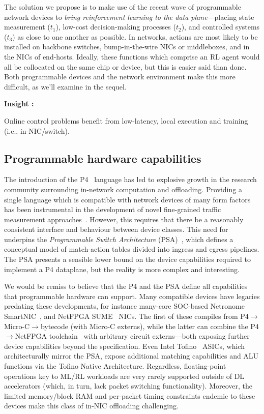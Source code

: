 \documentclass[sigconf,natbib=false]{acmart}
\newcounter{insightc}
\newenvironment{insight}
	{
		\begin{tipblock}\refstepcounter{insightc}\textbf{Insight \theinsightc:}\em
	}
	{
		\end{tipblock}
	}
\begin{document}
The solution we propose is to make use of the recent wave of programmable network devices to \emph{bring reinforcement learning to the data plane}---placing state measurement ($t_1$), low-cost decision-making processes ($t_2$), and controlled systems ($t_3$) as close to one another as possible.
In networks, actions are most likely to be installed on backbone switches, bump-in-the-wire NICs or middleboxes, and in the NICs of end-hosts.
Ideally, these functions which comprise an RL agent would all be collocated on the same chip or device, but this is easier said than done. 
Both programmable devices and the network environment make this more difficult, as we'll examine in the sequel.

\begin{insight}
	Online control problems benefit from low-latency, local execution and training (i.e., in-NIC/switch).
\end{insight}

\subsection{Programmable hardware capabilities}
The introduction of the P4~\parencite{DBLP:journals/ccr/BosshartDGIMRSTVVW14} language has led to explosive growth in the research community surrounding in-network computation and offloading.
Providing a single language which is compatible with network devices of many form factors has been instrumental in the development of novel fine-grained traffic measurement approaches~\parencite{DBLP:conf/sigcomm/GuptaHCFRW18,DBLP:conf/sigcomm/ChenFKRR18,DBLP:conf/sosr/GhasemiBR17}.
However, this requires that there be a reasonably consistent interface and behaviour between device classes.
This need for underpins the \emph{Programmable Switch Architecture} (PSA)~\parencite{p4-psa}, which defines a conceptual model of match-action tables divided into ingress and egress pipelines.
The PSA presents a sensible lower bound on the device capabilities required to implement a P4 dataplane, but the reality is more complex and interesting.

We would be remiss to believe that the P4 and the PSA define all capabilities that programmable hardware can support.
Many compatible devices have legacies predating these developments, for instance many-core SOC-based Netronome SmartNIC~\parencite{netronome-smartnic}, and NetFPGA SUME~\parencite{DBLP:journals/micro/ZilbermanACM14} NICs.
The first of these compiles from P4$\rightarrow$Micro-C$\rightarrow$bytecode (with Micro-C externs), while the latter can combine the P4$\rightarrow$NetFPGA toolchain~\parencite{DBLP:conf/fpga/IbanezBMZ19} with arbitrary circuit externs---both exposing further device capabilities beyond the specification.
Even Intel Tofino~\parencite{barefoot-intel} ASICs, which architecturally mirror the PSA, expose additional matching capabilities and ALU functions via the Tofino Native Architecture.
Regardless, floating-point operations key to ML/RL workloads are very rarely supported outside of DL accelerators (which, in turn, lack packet switching functionality).
Moreover, the limited memory/block RAM and per-packet timing constraints endemic to these devices make this class of in-NIC offloading challenging.
\end{document}
